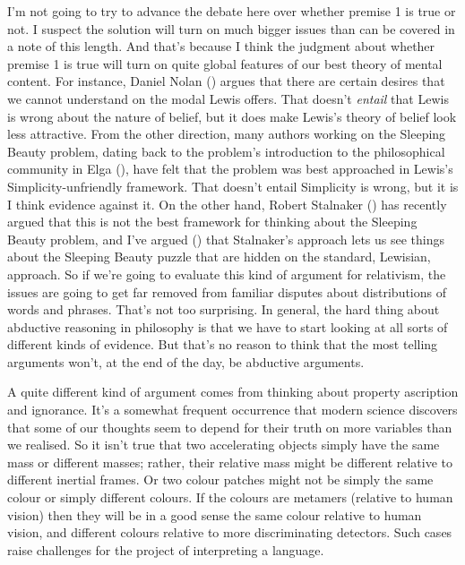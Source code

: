 \documentclass[
  11pt,
  letterpaper,
  DIV=11,
  numbers=noendperiod,
  twoside]{scrartcl}
\begin{document}
I'm not going to try to advance the debate here over whether premise 1
is true or not. I suspect the solution will turn on much bigger issues
than can be covered in a note of this length. And that's because I think
the judgment about whether premise 1 is true will turn on quite global
features of our best theory of mental content. For instance, Daniel
Nolan () argues that there are
certain desires that we cannot understand on the modal Lewis offers.
That doesn't \emph{entail} that Lewis is wrong about the nature of
belief, but it does make Lewis's theory of belief look less attractive.
From the other direction, many authors working on the Sleeping Beauty
problem, dating back to the problem's introduction to the philosophical
community in Elga (), have felt that
the problem was best approached in Lewis's Simplicity-unfriendly
framework. That doesn't entail Simplicity is wrong, but it is I think
evidence against it. On the other hand, Robert Stalnaker
() has recently argued that
this is not the best framework for thinking about the Sleeping Beauty
problem, and I've argued () that Stalnaker's approach lets us see things about the Sleeping
Beauty puzzle that are hidden on the standard, Lewisian, approach. So if
we're going to evaluate this kind of argument for relativism, the issues
are going to get far removed from familiar disputes about distributions
of words and phrases. That's not too surprising. In general, the hard
thing about abductive reasoning in philosophy is that we have to start
looking at all sorts of different kinds of evidence. But that's no
reason to think that the most telling arguments won't, at the end of the
day, be abductive arguments.

A quite different kind of argument comes from thinking about property
ascription and ignorance. It's a somewhat frequent occurrence that
modern science discovers that some of our thoughts seem to depend for
their truth on more variables than we realised. So it isn't true that
two accelerating objects simply have the same mass or different masses;
rather, their relative mass might be different relative to different
inertial frames. Or two colour patches might not be simply the same
colour or simply different colours. If the colours are metamers
(relative to human vision) then they will be in a good sense the same
colour relative to human vision, and different colours relative to more
discriminating detectors. Such cases raise challenges for the project of
interpreting a language.
\end{document}
